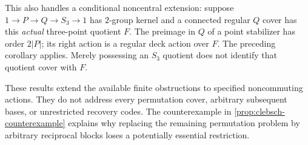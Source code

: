 This also handles a conditional noncentral extension: suppose
$1\to P\to Q\to S_3\to1$ has $2$-group kernel and a connected
regular $Q$ cover has this \emph{actual} three-point quotient $F$.
The preimage in $Q$ of a point stabilizer has order $2|P|$; its
right action is a regular deck action over $F$. The preceding
corollary applies. Merely possessing an $S_3$ quotient does not
identify that quotient cover with $F$.

These results extend the available finite obstructions to specified
noncommuting actions. They do not address every permutation cover,
arbitrary subsequent bases, or unrestricted recovery codes. The
counterexample in \cref{prop:clebsch-counterexample} explains why
replacing the remaining permutation problem by arbitrary reciprocal
blocks loses a potentially essential restriction.
